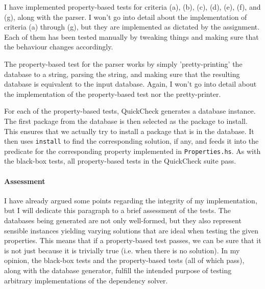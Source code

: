\noindent I have implemented property-based tests for criteria (a), (b), (c), (d), (e), (f), and (g), along with the parser. I won't go into detail about the implementation of criteria (a) through (g), but they are implemented as dictated by the assignment. Each of them has been tested manually by tweaking things and making sure that the behaviour changes accordingly.

The property-based test for the parser works by simply 'pretty-printing' the database to a string, parsing the string, and making sure that the resulting database is equivalent to the input database. Again, I won't go into detail about the implementation of the property-based test nor the pretty-printer.

For each of the property-based tests, QuickCheck generates a database instance. The first package from the database is then selected as the package to install. This ensures that we actually try to install a package that is in the database. It then uses \texttt{install} to find the corresponding solution, if any, and feeds it into the predicate for the corresponding property implemented in \texttt{Properties.hs}. As with the black-box tests, all property-based tests in the QuickCheck suite pass.


\paragraph{Assessment}
I have already argued some points regarding the integrity of my implementation, but I will dedicate this paragraph to a brief assessment of the tests. The databases being generated are not only well-formed, but they also represent sensible instances yielding varying solutions that are ideal when testing the given properties. This means that if a property-based test passes, we can be sure that it is not just because it is trivially true (i.e. when there is no solution). In my opinion, the black-box tests and the property-based tests (all of which pass), along with the database generator, fulfill the intended purpose of testing arbitrary implementations of the dependency solver.
